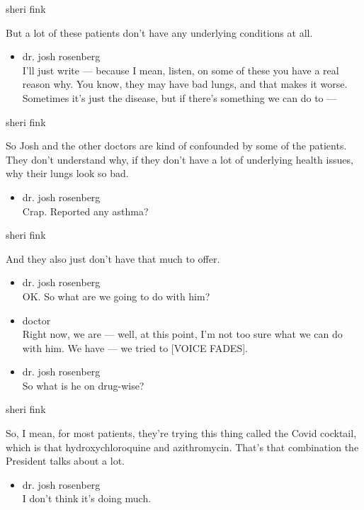 sheri fink

But a lot of these patients don't have any underlying conditions at all.

\begin{itemize}
\tightlist
\item
  dr. josh rosenberg\\
  I'll just write --- because I mean, listen, on some of these you have
  a real reason why. You know, they may have bad lungs, and that makes
  it worse. Sometimes it's just the disease, but if there's something we
  can do to ---
\end{itemize}

sheri fink

So Josh and the other doctors are kind of confounded by some of the
patients. They don't understand why, if they don't have a lot of
underlying health issues, why their lungs look so bad.

\begin{itemize}
\tightlist
\item
  dr. josh rosenberg\\
  Crap. Reported any asthma?
\end{itemize}

sheri fink

And they also just don't have that much to offer.

\begin{itemize}
\item
  dr. josh rosenberg\\
  OK. So what are we going to do with him?
\item
  doctor\\
  Right now, we are --- well, at this point, I'm not too sure what we
  can do with him. We have --- we tried to {[}VOICE FADES{]}.
\item
  dr. josh rosenberg\\
  So what is he on drug-wise?
\end{itemize}

sheri fink

So, I mean, for most patients, they're trying this thing called the
Covid cocktail, which is that hydroxychloroquine and azithromycin.
That's that combination the President talks about a lot.

\begin{itemize}
\tightlist
\item
  dr. josh rosenberg\\
  I don't think it's doing much.
\end{itemize}


